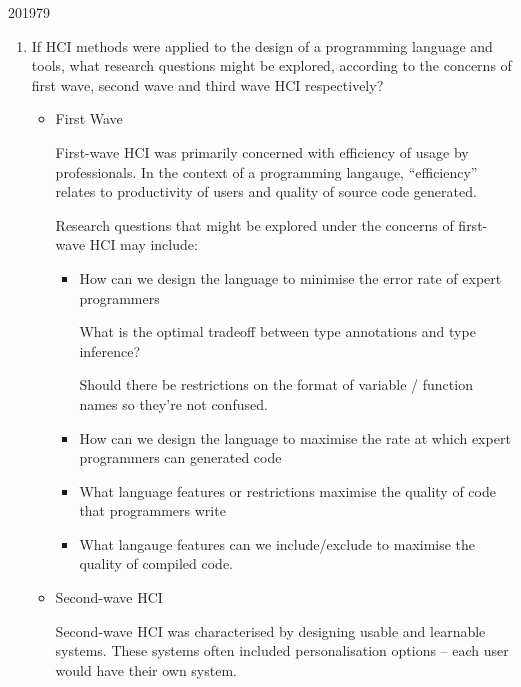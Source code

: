 \documentclass[10pt,\jkfside,a4paper]{article}
\begin{document}
\begin{examquestion}{2019}{7}{9}

\begin{enumerate}

\item If HCI methods were applied to the design of a programming language
and tools, what research questions might be explored, according to the
concerns of first wave, second wave and third wave HCI respectively?

\begin{itemize}

\item First Wave

First-wave HCI was primarily concerned with efficiency of usage by
professionals. In the context of a programming langauge, ``efficiency''
relates to productivity of users and quality of source code generated.

Research questions that might be explored under the concerns of first-wave
HCI may include:

\begin{itemize}

\item How can we design the language to minimise the error rate of
expert programmers

What is the optimal tradeoff between type annotations and type inference?

Should there be restrictions on the format of variable / function names so
they're not confused.

\item How can we design the language to maximise the rate at which
expert programmers can generated code

\item What language features or restrictions maximise the quality of code
that programmers write

\item What langauge features can we include/exclude to maximise the quality
of compiled code.

\end{itemize}

\item Second-wave HCI

Second-wave HCI was characterised by designing usable and learnable systems.
These systems often included personalisation options -- each user would
have their own system.

\begin{itemize}


\end{itemize}
\end{itemize}
\end{enumerate}
\end{examquestion}
\end{document}
